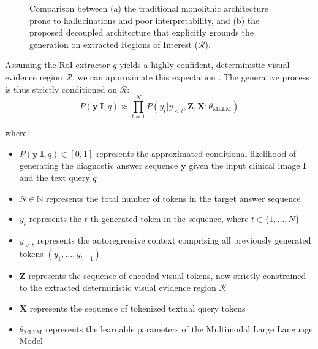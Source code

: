 \begin{figure}[H]
{
} %
\caption{Comparison between (a) the traditional monolithic architecture prone to hallucinations and poor interpretability, and (b) the proposed decoupled architecture that explicitly grounds the generation on extracted Regions of Interest ($\mathcal{R}$).}
\label{fig:vqa_paradigms}
\end{figure}

Assuming the RoI extractor $g$ yields a highly confident, deterministic visual evidence region $\mathcal{R}$, we can approximate this expectation \cite{chen2024rllava, anderson2018bottom-up}. The generative process is thus strictly conditioned on $\mathcal{R}$:
\begin{equation}
P(\mathbf{y} | \mathbf{I}, q) \approx \prod_{t=1}^{N} P(y_t | y_{<t}, \mathbf{Z}, \mathbf{X}; \theta_{\text{MLLM}})
\end{equation}

where:
\begin{itemize}
\item $P(\mathbf{y} | \mathbf{I}, q) \in [0,1]$ represents the approximated conditional likelihood of generating the diagnostic answer sequence $\mathbf{y}$ given the input clinical image $\mathbf{I}$ and the text query $q$
\item $N \in \mathbb{N}$ represents the total number of tokens in the target answer sequence
\item $y_t$ represents the $t$-th generated token in the sequence, where $t \in \{1, \dots, N\}$
\item $y_{<t}$ represents the autoregressive context comprising all previously generated tokens $(y_1, \dots, y_{t-1})$
\item $\mathbf{Z}$ represents the sequence of encoded visual tokens, now strictly constrained to the extracted deterministic visual evidence region $\mathcal{R}$
\item $\mathbf{X}$ represents the sequence of tokenized textual query tokens
\item $\theta_{\text{MLLM}}$ represents the learnable parameters of the Multimodal Large Language Model
\end{itemize}

